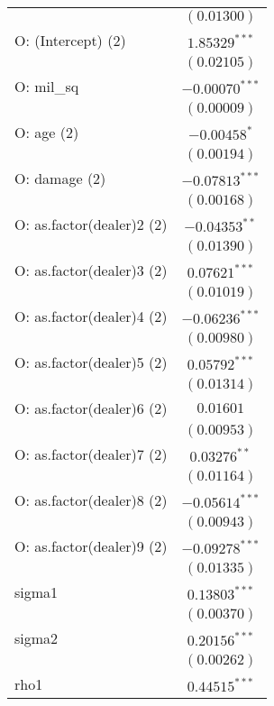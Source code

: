 \begin{table}
\begin{center}
\begin{tiny}
\begin{tabular}{l c}
                          & $(0.01300)$      \\
O: (Intercept) (2)        & $1.85329^{***}$  \\
                          & $(0.02105)$      \\
O: mil\_sq                & $-0.00070^{***}$ \\
                          & $(0.00009)$      \\
O: age (2)                & $-0.00458^{*}$   \\
                          & $(0.00194)$      \\
O: damage (2)             & $-0.07813^{***}$ \\
                          & $(0.00168)$      \\
O: as.factor(dealer)2 (2) & $-0.04353^{**}$  \\
                          & $(0.01390)$      \\
O: as.factor(dealer)3 (2) & $0.07621^{***}$  \\
                          & $(0.01019)$      \\
O: as.factor(dealer)4 (2) & $-0.06236^{***}$ \\
                          & $(0.00980)$      \\
O: as.factor(dealer)5 (2) & $0.05792^{***}$  \\
                          & $(0.01314)$      \\
O: as.factor(dealer)6 (2) & $0.01601$        \\
                          & $(0.00953)$      \\
O: as.factor(dealer)7 (2) & $0.03276^{**}$   \\
                          & $(0.01164)$      \\
O: as.factor(dealer)8 (2) & $-0.05614^{***}$ \\
                          & $(0.00943)$      \\
O: as.factor(dealer)9 (2) & $-0.09278^{***}$ \\
                          & $(0.01335)$      \\
sigma1                    & $0.13803^{***}$  \\
                          & $(0.00370)$      \\
sigma2                    & $0.20156^{***}$  \\
                          & $(0.00262)$      \\
rho1                      & $0.44515^{***}$  \\

\end{tabular}
\end{tiny}
\end{center}
\end{table}

